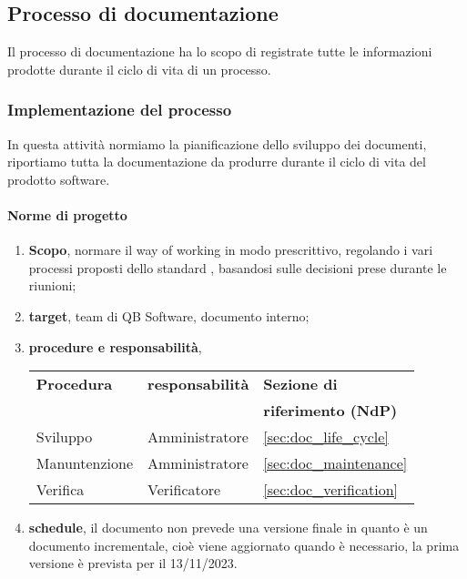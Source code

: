 \subsection{Processo di documentazione} \label{sec:documentation}
    Il processo di documentazione ha lo scopo di registrate tutte le informazioni prodotte durante il ciclo di vita di un processo.

    \subsubsection{Implementazione del processo}
        In questa attività normiamo la pianificazione dello sviluppo dei documenti, riportiamo tutta la documentazione da produrre durante il ciclo di vita del prodotto software.
        
        \paragraph{Norme di progetto}
            \begin{enumerate}
                \item \textbf{Scopo}, normare il way of working in modo prescrittivo, regolando i vari processi proposti dello standard \cite{bib:ISO12207_1997}, basandosi sulle decisioni prese durante le riunioni;
                \item \textbf{target}, team di QB Software, documento interno;
                \item \textbf{procedure e responsabilità},
                    \newline
                    \begin{tabularx}{0.93\textwidth}{|X|X|X|}
                        \hline
                        \textbf{Procedura} & \textbf{responsabilità} & \textbf{Sezione di} \\
                        & & \textbf{riferimento (NdP)} \\
                        \hline
                        Sviluppo & Amministratore &  \ref{sec:doc_life_cycle}
                        \\\hline
                        Manuntenzione & Amministratore & \ref{sec:doc_maintenance} 
                        \\\hline
                        Verifica & Verificatore & \ref{sec:doc_verification}
                        \\\hline
                    \end{tabularx}
                \item \textbf{schedule}, il documento non prevede una versione finale in quanto è un documento incrementale, cioè viene aggiornato quando è necessario, la prima versione è prevista per il 13/11/2023. 
            \end{enumerate} 

